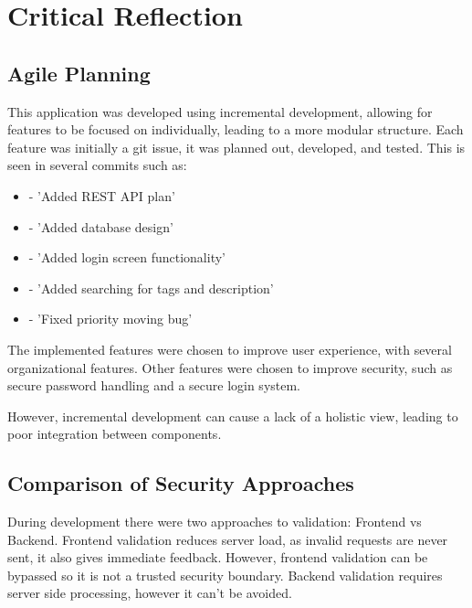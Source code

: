 

\clearpage
\section{Critical Reflection}


\subsection{Agile Planning} %

This application was developed using incremental development, allowing for features to be focused on individually, leading to a more modular structure. Each feature was initially a git issue, it was planned out, developed, and tested. This is seen in several commits such as: 
\begin{itemize}
    \itemsep0em
    \item {} - 'Added REST API plan'
    \item {} - 'Added database design'
    \item {} - 'Added login screen functionality'
    \item {} - 'Added searching for tags and description'
    \item {} - 'Fixed priority moving bug'
\end{itemize}

The implemented features were chosen to improve user experience, with several organizational features. Other features were chosen to improve security, such as secure password handling and a secure login system.

However, incremental development can cause a lack of a holistic view, leading to poor integration between components.


\subsection{Comparison of Security Approaches} %

During development there were two approaches to validation: Frontend vs Backend. Frontend validation reduces server load, as invalid requests are never sent, it also gives immediate feedback. However, frontend validation can be bypassed so it is not a trusted security boundary. Backend validation requires server side processing, however it can't be avoided. 

